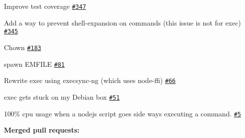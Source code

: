 \begin{DoxyItemize}
\item Improve test coverage \href{https://github.com/shelljs/shelljs/issues/347}{\tt \#347}
\item Add a way to prevent shell-\/expansion on commands (this issue is not for exec) \href{https://github.com/shelljs/shelljs/issues/345}{\tt \#345}
\item Chown \href{https://github.com/shelljs/shelljs/issues/183}{\tt \#183}
\item spawn E\+M\+F\+I\+LE \href{https://github.com/shelljs/shelljs/issues/81}{\tt \#81}
\item Rewrite exec using execsync-\/ng (which uses node-\/ffi) \href{https://github.com/shelljs/shelljs/issues/66}{\tt \#66}
\item {\ttfamily exec} gets stuck on my Debian box \href{https://github.com/shelljs/shelljs/issues/51}{\tt \#51}
\item 100\% cpu usage when a nodejs script goes side ways executing a command. \href{https://github.com/shelljs/shelljs/issues/5}{\tt \#5}
\end{DoxyItemize}

{\bfseries Merged pull requests\+:}


